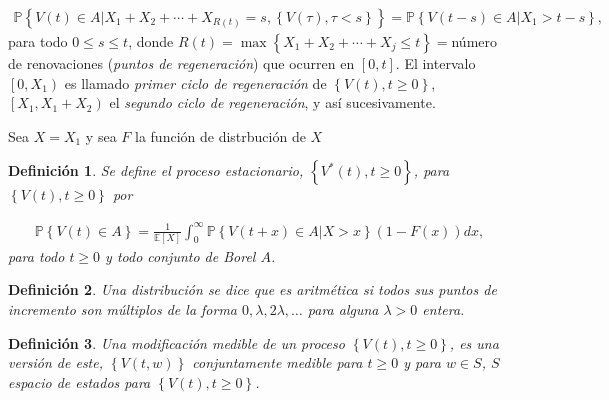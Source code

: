 \documentclass{article}
\newtheorem{Def}{Definición}
\newcommand{\esp}{\mathbb{E}}
\newcommand{\prob}{\mathbb{P}}
\begin{document}
\begin{eqnarray*}
\prob\left\{V\left(t\right)\in A|X_{1}+X_{2}+\cdots+X_{R\left(t\right)}=s,\left\{V\left(\tau\right),\tau<s\right\}\right\}=\prob\left\{V\left(t-s\right)\in A|X_{1}>t-s\right\},
\end{eqnarray*}
para todo $0\leq s\leq t$, donde $R\left(t\right)=\max\left\{X_{1}+X_{2}+\cdots+X_{j}\leq t\right\}=$n\'umero de renovaciones ({\emph{puntos de regeneraci\'on}}) que ocurren en $\left[0,t\right]$. El intervalo $\left[0,X_{1}\right)$ es llamado {\emph{primer ciclo de regeneraci\'on}} de $\left\{V\left(t \right),t\geq0\right\}$, $\left[X_{1},X_{1}+X_{2}\right)$ el {\emph{segundo ciclo de regeneraci\'on}}, y as\'i sucesivamente.

Sea $X=X_{1}$ y sea $F$ la funci\'on de distrbuci\'on de $X$


\begin{Def}
Se define el proceso estacionario, $\left\{V^{*}\left(t\right),t\geq0\right\}$, para $\left\{V\left(t\right),t\geq0\right\}$ por

\begin{eqnarray*}
\prob\left\{V\left(t\right)\in A\right\}=\frac{1}{\esp\left[X\right]}\int_{0}^{\infty}\prob\left\{V\left(t+x\right)\in A|X>x\right\}\left(1-F\left(x\right)\right)dx,
\end{eqnarray*} 
para todo $t\geq0$ y todo conjunto de Borel $A$.
\end{Def}

\begin{Def}
Una distribuci\'on se dice que es {\emph{aritm\'etica}} si todos sus puntos de incremento son m\'ultiplos de la forma $0,\lambda, 2\lambda,\ldots$ para alguna $\lambda>0$ entera.
\end{Def}


\begin{Def}
Una modificaci\'on medible de un proceso $\left\{V\left(t\right),t\geq0\right\}$, es una versi\'on de este, $\left\{V\left(t,w\right)\right\}$ conjuntamente medible para $t\geq0$ y para $w\in S$, $S$ espacio de estados para $\left\{V\left(t\right),t\geq0\right\}$.
\end{Def}
\end{document}
